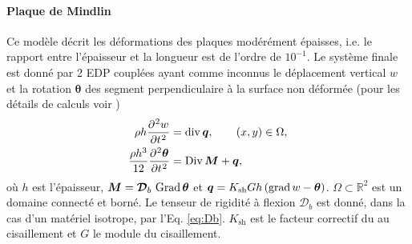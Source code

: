 \paragraph{Plaque de Mindlin}
Ce modèle décrit les déformations des plaques modérément épaisses, i.e. le rapport entre l'épaisseur et la longueur est de l'ordre de $10^{-1}$. Le système finale est donné par 2 EDP couplées ayant comme inconnus le déplacement vertical $w$ et la rotation $\bm{\theta}$ des segment perpendiculaire à la surface non déformée (pour les détails de calculs voir \cite[Chapter 10]{reddy2006theory})
\begin{equation*}
\begin{aligned}
\rho h \diffp[2]{w}{t} &= \div \bm{q}, \qquad (x,y) \in \Omega, \\
\frac{\rho h^3}{12} \diffp[2]{\bm{\theta}}{t} &=\Div \bm{M} + \bm{q},
\end{aligned}
\end{equation*}
où $h$ est l'épaisseur, $\bm{M}= \bm{\mathcal{D}}_b\,\operatorname*{Grad}{\bm{\theta}}$ et $\bm{q}= K_{\text{sh}} Gh\,(\operatorname*{grad} w - \bm{\theta})$. $\Omega \subset \mathbb{R}^2$ est un domaine connecté et borné. Le tenseur de rigidité à flexion $\bm{\mathcal{D}}_b$ est donné, dans la cas d'un matériel isotrope, par l'Eq. \eqref{eq:Db}. $K_{\text{sh}}$ est le facteur correctif du au cisaillement et $G$ le module du cisaillement.

